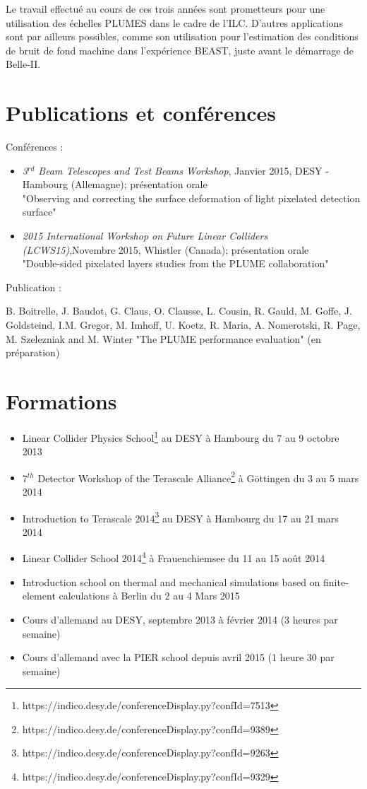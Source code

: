\documentclass[a4papper, 10pt]{article}
\begin{document}
  Le travail effectué au cours de ces trois années sont prometteurs pour une utilisation des échelles PLUMES dans le cadre de l'ILC.
  D'autres applications sont par ailleurs possibles, comme son utilisation pour l'estimation des conditions de bruit de fond machine dans l'expérience BEAST, juste avant le démarrage de Belle-II.

 
  \section*{Publications et conférences}

  Conférences :
  \begin{itemize}
    \item \textit{3$^{rd}$ Beam Telescopes and Test Beams Workshop}, Janvier 2015, DESY - Hambourg (Allemagne); présentation orale\\
    "Observing and correcting the surface deformation of light pixelated detection surface"
    \item \textit{2015 International Workshop on Future Linear Colliders (LCWS15)},Novembre 2015,  Whistler (Canada); présentation orale\\
    "Double-sided pixelated layers studies from the PLUME collaboration"
  \end{itemize}
  Publication :
  
  B. Boitrelle, J. Baudot, G. Claus, O. Clausse, L. Cousin, R. Gauld, M. Goffe, J. Goldsteind, I.M. Gregor, M. Imhoff, U. Koetz, R. Maria, A. Nomerotski, R. Page, M. Szelezniak and M. Winter "The PLUME performance evaluation" (en préparation)

  \section*{Formations}
 
  \begin{itemize}
    \item Linear Collider Physics School\footnote{https://indico.desy.de/conferenceDisplay.py?confId=7513} au DESY à Hambourg du 7 au 9 octobre 2013
    \item 7$^{th}$ Detector Workshop of the Terascale Alliance\footnote{https://indico.desy.de/conferenceDisplay.py?confId=9389} à Göttingen du 3 au 5 mars 2014
    \item Introduction to Terascale 2014\footnote{https://indico.desy.de/conferenceDisplay.py?confId=9263} au DESY à Hambourg du 17 au 21 mars 2014
    \item Linear Collider School 2014\footnote{https://indico.desy.de/conferenceDisplay.py?confId=9329} à Frauenchiemsee du 11 au 15 août 2014
    \item Introduction school on thermal and mechanical simulations based on finite-element calculations à Berlin du 2 au 4 Mars 2015
    \item Cours d'allemand au DESY, septembre 2013 à février 2014 (3 heures par semaine)
    \item Cours d'allemand avec la PIER school depuis avril 2015 (1 heure 30 par semaine)
  \end{itemize}

  
	
 
\end{document}
